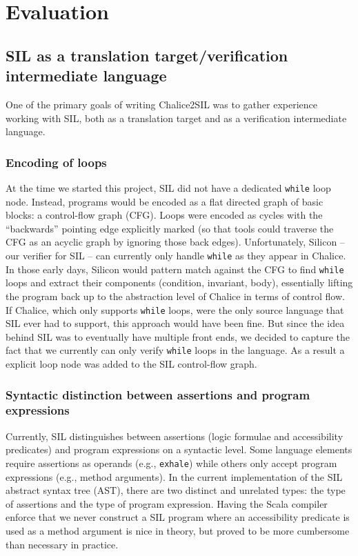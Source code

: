 
\section{Evaluation}\label{sct:eval}

\subsection{SIL as a translation target/verification intermediate language}
One of the primary goals of writing Chalice2SIL was to gather experience working with SIL, both as a translation target and as a verification intermediate language. 

\subsubsection{Encoding of loops}
At the time we started this project, SIL did not have a dedicated \lstinline[language=Chalice]!while! loop node. 
Instead, programs would be encoded as a flat directed graph of basic blocks: a control-flow graph (CFG).
Loops were encoded as cycles with the ``backwards'' pointing edge explicitly marked (so that tools could traverse the CFG as an acyclic graph by ignoring those back edges).
Unfortunately, Silicon -- our verifier for SIL -- can currently only handle \lstinline[language=Chalice]!while! as they appear in Chalice. 
In those early days, Silicon would pattern match against the CFG to find \lstinline[language=Chalice]!while! loops and extract their components (condition, invariant, body), essentially lifting the program back up to the abstraction level of Chalice in terms of control flow.
If Chalice, which only supports \lstinline[language=Chalice]!while! loops, were the only source language that SIL ever had to support, this approach would have been fine.
But since the idea behind SIL was to eventually have multiple front ends, we decided to capture the fact that we currently can only verify \lstinline[language=Chalice]!while! loops in the language.
As a result a explicit loop node was added to the SIL control-flow graph.

\subsubsection{Syntactic distinction between assertions and program expressions}
Currently, SIL distinguishes between assertions (logic formulae and accessibility predicates) and program expressions on a syntactic level. 
Some language elements require assertions as operands (e.g., \lstinline[language=SIL]!exhale!) while others only accept program expressions (e.g., method arguments).
In the current implementation of the SIL abstract syntax tree (AST), there are two distinct and unrelated types: the type of assertions and the type of program expression.
Having the Scala compiler enforce that we never construct a SIL program where an accessibility predicate is used as a method argument is nice in theory, but proved to be more cumbersome than necessary in practice.

